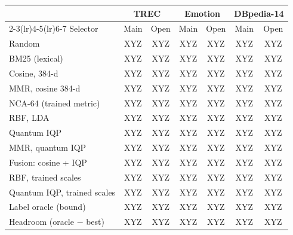 \begin{tabular}{@{}l cc cc cc@{}}
\toprule
 & \multicolumn{2}{c}{TREC} & \multicolumn{2}{c}{Emotion} & \multicolumn{2}{c}{DBpedia-14} \\
\cmidrule(lr){2-3}\cmidrule(lr){4-5}\cmidrule(lr){6-7}
Selector & Main & Open & Main & Open & Main & Open \\
\midrule
Random & XYZ & XYZ & XYZ & XYZ & XYZ & XYZ \\
BM25 (lexical) & XYZ & XYZ & XYZ & XYZ & XYZ & XYZ \\
Cosine, 384-d & XYZ & XYZ & XYZ & XYZ & XYZ & XYZ \\
MMR, cosine 384-d & XYZ & XYZ & XYZ & XYZ & XYZ & XYZ \\
NCA-64 (trained metric) & XYZ & XYZ & XYZ & XYZ & XYZ & XYZ \\
\midrule
RBF, LDA & XYZ & XYZ & XYZ & XYZ & XYZ & XYZ \\
Quantum IQP & XYZ & XYZ & XYZ & XYZ & XYZ & XYZ \\
MMR, quantum IQP & XYZ & XYZ & XYZ & XYZ & XYZ & XYZ \\
Fusion: cosine + IQP & XYZ & XYZ & XYZ & XYZ & XYZ & XYZ \\
RBF, trained scales & XYZ & XYZ & XYZ & XYZ & XYZ & XYZ \\
Quantum IQP, trained scales & XYZ & XYZ & XYZ & XYZ & XYZ & XYZ \\
\midrule
Label oracle (bound) & XYZ & XYZ & XYZ & XYZ & XYZ & XYZ \\
Headroom (oracle $-$ best) & XYZ & XYZ & XYZ & XYZ & XYZ & XYZ \\
\bottomrule
\end{tabular}
